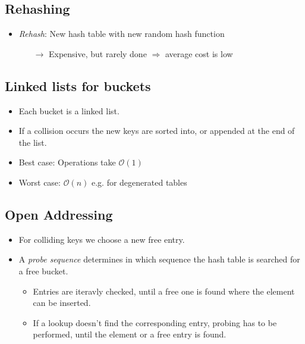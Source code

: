 \documentclass[12pt, a4paper]{scrartcl}
\newcommand{\bigO}{\mathcal{O}}
\renewcommand{\implies}{\Rightarrow}
\begin{document}
\subsection{Rehashing}
\label{sec:rehashing}
\begin{itemize}
\item \emph{Rehash}: New hash table with new random hash function
  \begin{itemize}
  \item[$\rightarrow$] Expensive, but rarely done $\implies$ average cost is low
  \end{itemize}
\end{itemize}

\subsection{Linked lists for buckets}
\label{sec:linked_lists_buckets}
\begin{itemize}
\item Each bucket is a linked list.
\item If a collision occurs the new keys are sorted into, or appended at the end of the list.
\item Best case: Operations take $\bigO(1)$
\item Worst case: $\bigO(n)$ e.g. for degenerated tables
\end{itemize}

\subsection{Open Addressing}
\label{sec:open_addressing}
\begin{itemize}
\item For colliding keys we choose a new free entry.
\item A \emph{probe sequence} determines in which sequence the hash table is searched for a free bucket.
  \begin{itemize}
  \item Entries are iteravly checked, until a free one is found where the element can be inserted.
  \item If a lookup doesn't find the corresponding entry, probing has to be performed, until the element or a free entry is found.
  \end{itemize}
\end{itemize}
\end{document}
